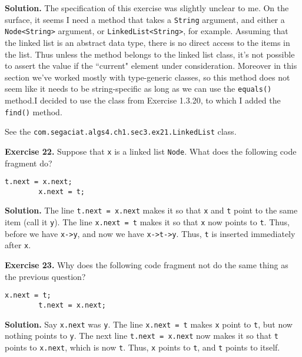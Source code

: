 \documentclass[12pt, a4paper]{article}
\newenvironment{ex}[2][Exercise]
{\par\medskip\noindent \textbf{#1 #2.}}
{\medskip}
\newenvironment{sol}[1][Solution]
{\par\medskip\noindent \textbf{#1.} }
{\medskip}
\begin{document}
	\begin{sol}
		The specification of this exercise was slightly unclear to me. On the surface,
		it seems I need a method that takes a \texttt{String} argument, and either a
		\texttt{Node<String>} argument, or \texttt{LinkedList<String>}, for example.
		Assuming that the linked list is an abstract data type, there is no direct access to
		the items in the list. Thus unless the method belongs to the linked list class, it's
		not possible to assert the value if the ``current" element under consideration.
		Moreover in this section we've worked mostly with type-generic classes, so
		this method does not seem like it needs to be string-specific as long as we
		can use the \texttt{equals()} method.I decided to use the class from Exercise 1.3.20,
		to which I added the \texttt{find()} method.
		
		See the \texttt{com.segaciat.algs4.ch1.sec3.ex21.LinkedList} class.
	\end{sol}
	\begin{ex}{22}
		Suppose that \texttt{x} is a linked list \texttt{Node}. What does the following
		code fragment do?
		\begin{lstlisting}[language={}]
		t.next = x.next;
		x.next = t;
		\end{lstlisting}
	\end{ex}
	\begin{sol}
		The line \texttt{t.next = x.next} makes it so that \texttt{x} and \texttt{t} point to
		the same item (call it \texttt{y}). The line \texttt{x.next = t} makes it so that
		\texttt{x} now points to \texttt{t}. Thus, before we have \texttt{x->}\texttt{y},
		and now we  have \texttt{x->t->y}. Thus, \texttt{t} is inserted immediately after
		\texttt{x}.
	\end{sol}
	\begin{ex}{23}
		Why does the following code fragment not do the same thing as the previous question?
		\begin{lstlisting}[language={}]
		x.next = t;
		t.next = x.next;
		\end{lstlisting}
	\end{ex}
	\begin{sol}
		Say \texttt{x.next} was \texttt{y}. The line \texttt{x.next = t} makes \texttt{x}
		point to \texttt{t}, but now nothing points to \texttt{y}. The next line
		\texttt{t.next = x.next} now makes it so that \texttt{t} points to \texttt{x.next},
		which is now \texttt{t}. Thus, \texttt{x} points to \texttt{t}, and \texttt{t}
		points to itself.
	\end{sol}
\end{document}
